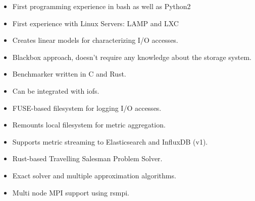 \documentclass[10pt,a4paper,ragged2e,withhyper]{altacv}
\begin{document}
\begin{paracol}{2}
\divider

\medskip
\begin{itemize}
\item First programming experience in bash as well as Python2
\item First experience with Linux Servers: LAMP and LXC
\end{itemize}


\medskip
\begin{itemize}
\item Creates linear models for characterizing I/O accesses.
\item Blackbox approach, doesn't require any knowledge about the storage system.
\item Benchmarker written in C and Rust.
\item Can be integrated with iofs.
\end{itemize}

\divider

\medskip
\begin{itemize}
\item FUSE-based filesystem for logging I/O accesses.
\item Remounts local filesystem for metric aggregation.
\item Supports metric streaming to Elasticsearch and InfluxDB (v1).
\end{itemize}

\divider

\medskip
\begin{itemize}
\item Rust-based Travelling Salesman Problem Solver.
\item Exact solver and multiple approximation algorithms.
\item Multi node MPI support using rsmpi.
\end{itemize}


\end{paracol}
\end{document}
